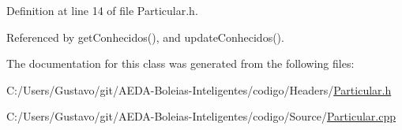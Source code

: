 Definition at line 14 of file Particular.\+h.



Referenced by get\+Conhecidos(), and update\+Conhecidos().



The documentation for this class was generated from the following files\+:\begin{DoxyCompactItemize}
\item 
C\+:/\+Users/\+Gustavo/git/\+A\+E\+D\+A-\/\+Boleias-\/\+Inteligentes/codigo/\+Headers/\hyperlink{_particular_8h}{Particular.\+h}\item 
C\+:/\+Users/\+Gustavo/git/\+A\+E\+D\+A-\/\+Boleias-\/\+Inteligentes/codigo/\+Source/\hyperlink{_particular_8cpp}{Particular.\+cpp}\end{DoxyCompactItemize}
